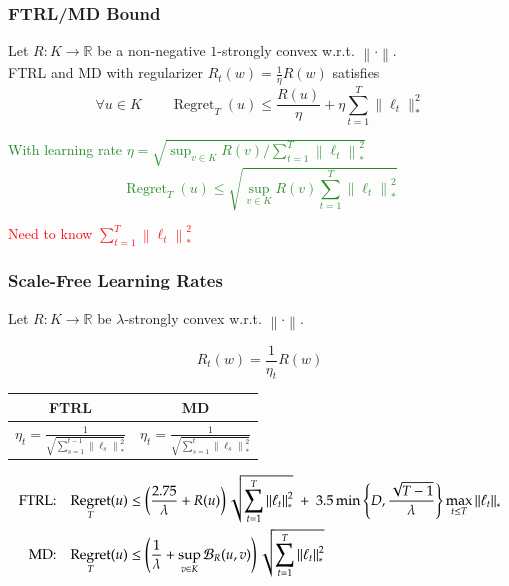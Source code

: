 \documentclass[usenames,dvipsnames]{beamer}
\DeclareMathOperator{\Regret}{Regret}
\newcommand{\R}{\mathbb{R}}
\newcommand{\norm}[1]{\left\|#1\right\|}
\newcommand{\Breg}{\mathcal{B}}
\begin{document}
\begin{frame}
\frametitle{FTRL/MD Bound}

\begin{theorem}[\textcolor{Blue}{CBL'06, SS'11}]
Let $R:K \to \R$ be a non-negative $1$-strongly convex w.r.t. $\norm{\cdot}$. \\
FTRL and MD with regularizer $R_t(w) = \frac{1}{\eta} R(w)$ satisfies
$$
\forall u \in K \qquad  \Regret_T(u) \le \frac{R(u)}{\eta} + \eta \sum_{t=1}^T \|\ell_t\|_*^2
$$
\end{theorem}

\pause
\textcolor{ForestGreen}{
With learning rate $\eta = \sqrt{\sup_{v \in K} R(v)/\sum_{t=1}^T \norm{\ell_t}_*^2}$
$$
\Regret_T(u) \le \sqrt{\sup_{v \in K} R(v) \sum_{t=1}^T \norm{\ell_t}_*^2}
$$}

\pause
\textcolor{red}{Need to know $\sum_{t=1}^T \norm{\ell_t}_*^2$}
\end{frame}

\begin{frame}
\frametitle{Scale-Free Learning Rates}
Let $R:K \to \R$ be $\lambda$-strongly convex w.r.t. $\norm{\cdot}$.

\vspace{0.2cm}

\begin{minipage}{4cm}
$$
R_t(w) = \frac{1}{\eta_t} R(w)
$$
\end{minipage}
%
\begin{minipage}{5cm}
\begin{center}
\def\arraystretch{2}%
\everymath{\displaystyle}
\begin{tabular}{c|c}
FTRL & MD \\ \hline
$\eta_t = \frac{1}{\sqrt{\sum_{s=1}^{t-1} \norm{\ell_s}_*^2}}$ &  $\eta_t = \frac{1}{\sqrt{\sum_{s=1}^t \norm{\ell_s}_*^2}}$ \\
\end{tabular}
\end{center}
\end{minipage}

\pause

\vspace{0.5cm}

\begin{center}
\fontsize{8.5pt}{10}\selectfont
\begin{align*}
\textsc{FTRL:} & & \Regret_T(u) & \le \left( \frac{2.75}{\lambda} + R(u)\right) \sqrt{\sum_{t=1}^T \norm{\ell_t}_*^2} \ + \ 3.5 \min \left\{ D, \frac{\sqrt{T-1}}{\lambda} \right\} \max_{t \le T} \norm{\ell_t}_* \\
\textsc{MD:} & & \Regret_T(u) & \le \left( \frac{1}{\lambda} + \sup_{v \in K} \Breg_{R}(u,v) \right) \sqrt{\sum_{t=1}^T \norm{\ell_t}_*^2}
\end{align*}
\end{center}

\end{frame}
\end{document}
